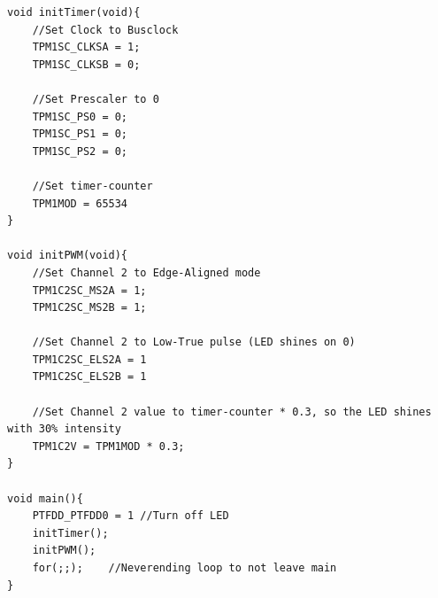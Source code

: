 \documentclass[a4paper, 11pt, nofootinbib]{article}
\begin{document}
\begin{lstlisting}
void initTimer(void){
	//Set Clock to Busclock
	TPM1SC_CLKSA = 1;
	TPM1SC_CLKSB = 0;
	
	//Set Prescaler to 0
	TPM1SC_PS0 = 0;
	TPM1SC_PS1 = 0;
	TPM1SC_PS2 = 0;
	
	//Set timer-counter
	TPM1MOD = 65534
}

void initPWM(void){
	//Set Channel 2 to Edge-Aligned mode
	TPM1C2SC_MS2A = 1;
	TPM1C2SC_MS2B = 1;
	
	//Set Channel 2 to Low-True pulse (LED shines on 0)
	TPM1C2SC_ELS2A = 1
	TPM1C2SC_ELS2B = 1
	
	//Set Channel 2 value to timer-counter * 0.3, so the LED shines with 30% intensity
	TPM1C2V = TPM1MOD * 0.3;
}

void main(){
	PTFDD_PTFDD0 = 1 //Turn off LED
	initTimer();
	initPWM();
	for(;;);	//Neverending loop to not leave main
}
\end{lstlisting}
\end{document}
